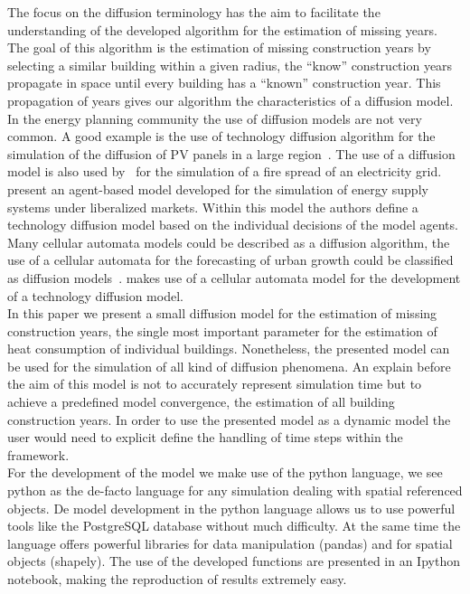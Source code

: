 The focus on the diffusion terminology has the aim to facilitate the
understanding of the developed algorithm for the estimation of missing years.
The goal of this algorithm is the estimation of missing construction years by
selecting a similar building within a given radius, the ``know'' construction
years propagate in space until every building has a ``known'' construction
year. This propagation of years gives our algorithm the characteristics of a
diffusion model.\\

In the energy planning community the use of diffusion models are not very
common. A good example is the use of technology diffusion algorithm for the
simulation of the diffusion of PV panels in a large region~\cite{Linder.2013}.
The use of a diffusion model is also used by~ for the
simulation of a fire spread of an electricity grid. 
 present an agent-based model developed for the simulation
of energy supply systems under liberalized markets. Within this model the
authors define a technology diffusion model based on the individual decisions
of the model agents.
%
Many cellular automata models could be described as a diffusion algorithm, the
use of a cellular automata for the forecasting of urban growth could be
classified as diffusion models~\cite{Han.2009,Batty.1999}. 
makes use of a cellular automata model for the development of a technology
diffusion model.\\

In this paper we present a small diffusion model for the estimation of missing
construction years, the single most important parameter for the estimation of
heat consumption of individual buildings. Nonetheless, the presented model can
be used for the simulation of all kind of diffusion phenomena. An explain
before the aim of this model is not to accurately represent simulation time but
to achieve a predefined model convergence, the estimation of all building
construction years. In order to use the presented model as a dynamic model the
user would need to explicit define the handling of time steps within the
framework.\\

For the development of the model we make use of the python language, we see
python as the de-facto language for any simulation dealing with spatial
referenced objects. De model development in the python language allows us to
use powerful tools like the PostgreSQL database without much difficulty. At the
same time the language offers powerful libraries for data manipulation
(pandas) and for spatial objects (shapely). The use of the developed functions
are presented in an Ipython notebook, making the reproduction of results
extremely easy.\\

